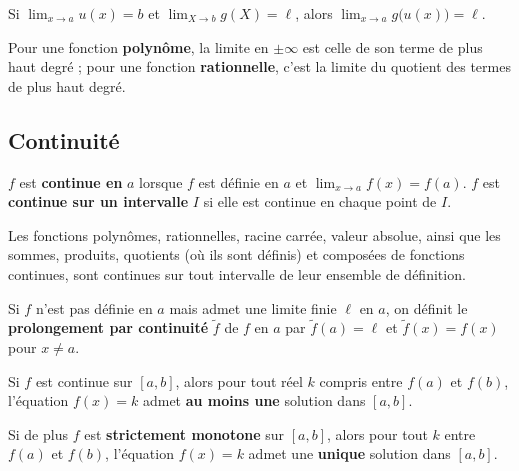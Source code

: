 \begin{theoreme}
Si $\displaystyle\lim_{x\to a}u(x)=b$ et $\displaystyle\lim_{X\to b}g(X)=\ell$, alors
$\displaystyle\lim_{x\to a}g\big(u(x)\big)=\ell$.
\end{theoreme}

\begin{remarque}
Pour une fonction \textbf{polynôme}, la limite en $\pm\infty$ est celle de son terme de plus haut degré ; pour une fonction \textbf{rationnelle}, c'est la limite du quotient des termes de plus haut degré.
\end{remarque}

\subsection{Continuité}

\begin{definition}
$f$ est \textbf{continue en} $a$ lorsque $f$ est définie en $a$ et
$\displaystyle\lim_{x\to a}f(x)=f(a)$.
$f$ est \textbf{continue sur un intervalle} $I$ si elle est continue en chaque point de $I$.
\end{definition}

\begin{propriete}
Les fonctions polynômes, rationnelles, racine carrée, valeur absolue, ainsi que les sommes, produits, quotients (où ils sont définis) et composées de fonctions continues, sont continues sur tout intervalle de leur ensemble de définition.
\end{propriete}

\begin{definition}
Si $f$ n'est pas définie en $a$ mais admet une limite finie $\ell$ en $a$, on définit le \textbf{prolongement par continuité} $\tilde f$ de $f$ en $a$ par $\tilde f(a)=\ell$ et $\tilde f(x)=f(x)$ pour $x\neq a$.
\end{definition}

\begin{theoreme}
Si $f$ est continue sur $[a,b]$, alors pour tout réel $k$ compris entre $f(a)$ et $f(b)$, l'équation $f(x)=k$ admet \textbf{au moins une} solution dans $[a,b]$.
\end{theoreme}

\begin{propriete}
Si de plus $f$ est \textbf{strictement monotone} sur $[a,b]$, alors pour tout $k$ entre $f(a)$ et $f(b)$, l'équation $f(x)=k$ admet une \textbf{unique} solution dans $[a,b]$.
\end{propriete}

